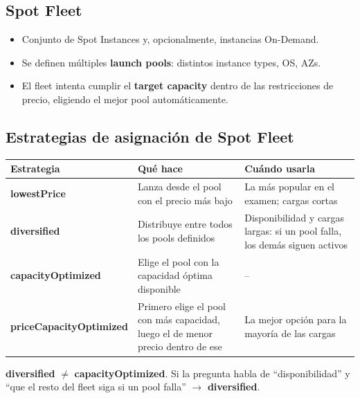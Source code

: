 \documentclass[11pt,a4paper]{article}
\let\oldsubsection\subsection
\renewcommand{\subsection}{\Needspace{6\baselineskip}\oldsubsection}
\begin{document}
\subsection{Spot Fleet}
\begin{itemize}
  \item Conjunto de Spot Instances y, opcionalmente, instancias On-Demand.
  \item Se definen múltiples \textbf{launch pools}: distintos instance types, OS, AZs.
  \item El fleet intenta cumplir el \textbf{target capacity} dentro de las restricciones de precio, eligiendo el mejor pool automáticamente.
\end{itemize}

\subsection{Estrategias de asignación de Spot Fleet}
\begin{tabularx}{\linewidth}{@{}>{\bfseries}l L L@{}}
\toprule
Estrategia & Qué hace & Cuándo usarla \\
\midrule
lowestPrice & Lanza desde el pool con el precio más bajo & La más popular en el examen; cargas cortas \\
diversified & Distribuye entre todos los pools definidos & Disponibilidad y cargas largas: si un pool falla, los demás siguen activos \\
capacityOptimized & Elige el pool con la capacidad óptima disponible & -- \\
priceCapacityOptimized & Primero elige el pool con más capacidad, luego el de menor precio dentro de ese & La mejor opción para la mayoría de las cargas \\
\bottomrule
\end{tabularx}

\begin{truco}[title=No confundir]
\textbf{diversified} $\neq$ \textbf{capacityOptimized}. Si la pregunta habla de ``disponibilidad'' y ``que el resto del fleet siga si un pool falla'' $\rightarrow$ \textbf{diversified}.
\end{truco}

\end{document}
